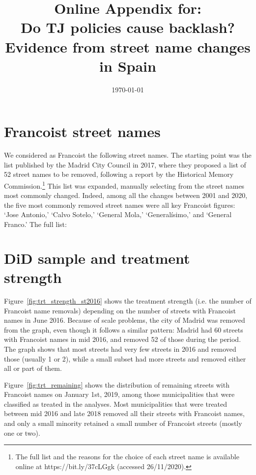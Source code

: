 \documentclass[12pt, titlepage]{article}
\title{\Large Online Appendix for:\\Do TJ policies cause backlash?\\Evidence from street name changes in Spain}
\author{}
\date{\today}
\begin{document}
\maketitle

\tableofcontents




% 
% 
% 

\clearpage
\section{Francoist street names}\label{franc_names_list}

We considered as Francoist the following street names. The starting point was the list published by the Madrid City Council in 2017, where they proposed a list of 52 street names to be removed, following a report by the Historical Memory Commission.\footnote{The full list and the reasons for the choice of each street name is available online at https://bit.ly/37cLGgk (accessed 26/11/2020).}
This list was expanded, manually selecting from the street names most commonly changed.
Indeed, among all the changes between 2001 and 2020, the five most commonly removed street names were all key Francoist figures: `Jose Antonio,' `Calvo Sotelo,' `General Mola,' `Generalísimo,' and `General Franco.' The full list:

\begin{quote}
  
\end{quote}

\clearpage
\section{DiD sample and treatment strength}

Figure~\ref{fig:trt_strength_st2016} shows the treatment strength (i.e. the number of Francoist name removals) depending on the number of streets with Francoist names in June 2016. Because of scale problems, the city of Madrid was removed from the graph, even though it follows a similar pattern: Madrid had 60 streets with Francoist names in mid 2016, and removed 52 of those during the period.
The graph shows that most streets had very few streets in 2016 and removed those (usually 1 or 2), while a small subset had more streets and removed either all or part of them.

Figure~\ref{fig:trt_remaining} shows the distribution of remaining streets with Francoist names on January 1st, 2019, among those municipalities that were classified as treated in the analyses.
Most municipalities that were treated between mid 2016 and late 2018 removed all their streets with Francoist names, and only a small minority retained a small number of Francoist streets (mostly one or two).
\end{document}
